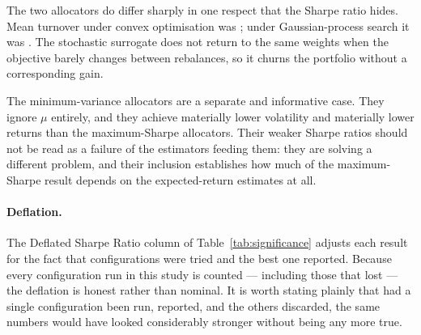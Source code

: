 The two allocators do differ sharply in one respect that the Sharpe ratio hides.
Mean turnover under convex optimisation was \convexTurnover{}; under
Gaussian-process search it was \gpTurnover{}. The stochastic surrogate does not
return to the same weights when the objective barely changes between rebalances,
so it churns the portfolio without a corresponding gain.

The minimum-variance allocators are a separate and informative case. They ignore
$\mu$ entirely, and they achieve materially lower volatility and materially lower
returns than the maximum-Sharpe allocators. Their weaker Sharpe ratios should not
be read as a failure of the estimators feeding them: they are solving a different
problem, and their inclusion establishes how much of the maximum-Sharpe result
depends on the expected-return estimates at all.

\paragraph{Deflation.} The Deflated Sharpe Ratio column of
Table~\ref{tab:significance} adjusts each result for the fact that \nTrials{}
configurations were tried and the best one reported. Because every configuration
run in this study is counted --- including those that lost --- the deflation is
honest rather than nominal. It is worth stating plainly that had a single
configuration been run, reported, and the others discarded, the same numbers would
have looked considerably stronger without being any more true.
